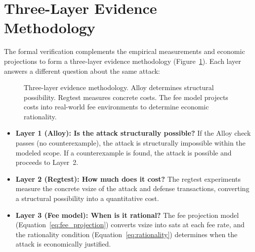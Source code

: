 \section{Three-Layer Evidence Methodology} \label{se:three_layer}

The formal verification complements the empirical measurements and economic projections
to form a three-layer evidence methodology (Figure~\ref{fig:three_layer}). Each layer
answers a different question about the same attack:

\begin{figure}[t]
\centering
{}
\caption{Three-layer evidence methodology. Alloy determines structural possibility.
Regtest measures concrete costs. The fee model projects costs into real-world
fee environments to determine economic rationality.}
\label{fig:three_layer}
\end{figure}

\begin{itemize}
\item \textbf{Layer 1 (Alloy): Is the attack structurally possible?}
  If the Alloy check passes (no counterexample), the attack is structurally
  impossible within the modeled scope. If a counterexample is found, the attack
  is possible and proceeds to Layer~2.

\item \textbf{Layer 2 (Regtest): How much does it cost?}
  The regtest experiments measure the concrete vsize of the attack and defense
  transactions, converting a structural possibility into a quantitative cost.

\item \textbf{Layer 3 (Fee model): When is it rational?}
  The fee projection model (Equation~\ref{eq:fee_projection}) converts vsize into
  sats at each fee rate, and the rationality condition
  (Equation~\ref{eq:rationality}) determines when the attack is economically justified.
\end{itemize}

